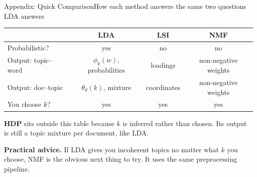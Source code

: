 \documentclass[aspectratio=169,10pt]{beamer}
\begin{document}
\begin{frame}{Appendix: Quick Comparison}{How each method answers the same two questions LDA answers}
  \begin{center}
    \small
    \begin{tabular}{@{}l c c c@{}}
      \toprule
                                & \textbf{LDA} & \textbf{LSI} & \textbf{NMF} \\
      \midrule
      Probabilistic?            & yes          & no           & no           \\
      Output: topic--word       & $\phi_k(w)$, probabilities & loadings & non-negative weights \\
      Output: doc--topic        & $\theta_d(k)$, mixture    & coordinates & non-negative weights \\
      You choose $k$?           & yes          & yes          & yes          \\
      \bottomrule
    \end{tabular}
  \end{center}

  \vspace{0.5em}
  \textbf{HDP} sits outside this table because $k$ is inferred rather than chosen. Its output is still a topic mixture per document, like LDA.

  \vspace{0.4em}
  \textbf{Practical advice.} If LDA gives you incoherent topics no matter what $k$ you choose, NMF is the
  obvious next thing to try. It uses the same preprocessing pipeline.
\end{frame}
\end{document}

